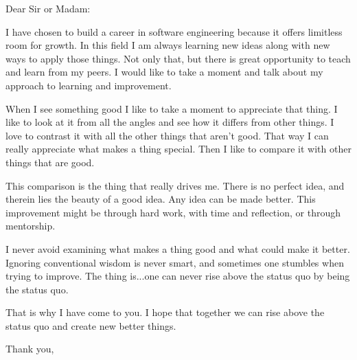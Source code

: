 \documentclass{letter}
\begin{document}
\begin{letter}{}
\opening{Dear Sir or Madam:}

I have chosen to build a career in software engineering because it offers limitless room for growth.
In this field I am always learning new ideas along with new ways to apply those things.
Not only that, but there is great opportunity to teach and learn from my peers.
I would like to take a moment and talk about my approach to learning and improvement.

When I see something good I like to take a moment to appreciate that thing.
I like to look at it from all the angles and see how it differs from other things.
I love to contrast it with all the other things that aren't good.
That way I can really appreciate what makes a thing special.
Then I like to compare it with other things that are good.

This comparison is the thing that really drives me.
There is no perfect idea, and therein lies the beauty of a good idea.
Any idea can be made better. This improvement might be through hard work,
with time and reflection, or through mentorship.

I never avoid examining what makes a thing good and what could make it better.
Ignoring conventional wisdom is never smart, and sometimes one stumbles when trying to improve.
The thing is...one can never rise above the status quo by being the status quo.

That is why I have come to you.
I hope that together we can rise above the status quo and create new better things.

\closing{Thank you,}
\end{letter}
\end{document}
